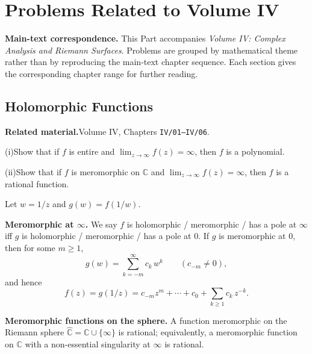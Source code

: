 \chapter{Problems Related to Volume IV}
\label{ch:companion-iv}

\par\medskip\noindent\textbf{Main-text correspondence.}\quad
This Part accompanies \emph{Volume IV: Complex Analysis and Riemann Surfaces}.
Problems are grouped by mathematical theme rather than by reproducing the main-text chapter sequence.
Each section gives the corresponding chapter range for further reading.

\section{Holomorphic Functions}

\par\medskip\noindent\textbf{Related material.}\quad Volume IV, Chapters \texttt{IV/01--IV/06}.

\begin{problem}[CP-IV-0005]
\label{prob:cp-iv-0005}
\par\noindent (i)\quad Show that if $f$ is entire and $\displaystyle \lim_{z\to\infty} f(z)=\infty$, then $f$ is a polynomial.
	\par\noindent (ii)\quad Show that if $f$ is meromorphic on $\mathbb C$ and $\displaystyle \lim_{z\to\infty} f(z)=\infty$, then $f$ is a rational function.

\bigskip

Let $w=1/z$ and $g(w)=f(1/w)$.

\medskip
\textbf{Meromorphic at $\infty$.} We say $f$ is holomorphic / meromorphic / has a pole at $\infty$
iff $g$ is holomorphic / meromorphic / has a pole at $0$.
If $g$ is meromorphic at $0$, then for some $m\ge1$,
\[
g(w)=\sum_{k=-m}^{\infty} c_k\,w^k \qquad (c_{-m}\neq 0),
\]
and hence
\[
f(z)=g(1/z)=c_{-m}z^m+\cdots+c_0+\sum_{k\ge1} c_k\,z^{-k}. \tag{$\ast$}
\]

\medskip
\textbf{Meromorphic functions on the sphere.}
A function meromorphic on the Riemann sphere $\widehat{\mathbb C}=\mathbb C\cup\{\infty\}$
is rational; equivalently, a meromorphic function on $\mathbb C$ with a non-essential singularity at $\infty$ is rational.

\bigskip
\end{problem}

